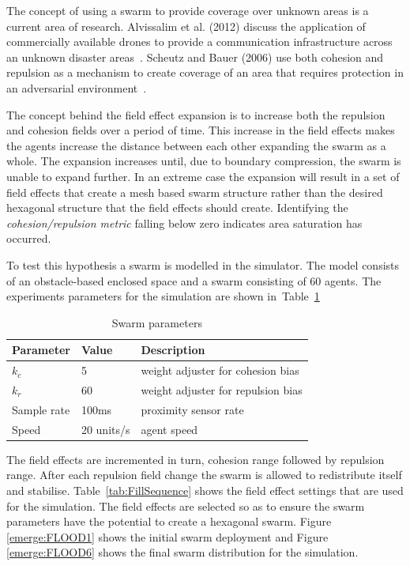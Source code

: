 \documentclass{ieeeaccess}
\begin{document}
The concept of using a swarm to provide coverage over unknown areas is a current area of research. Alvissalim et al. (2012) discuss the application of commercially available drones to provide a communication infrastructure across an unknown disaster areas~\cite{AZHMJJM:12}. Scheutz and Bauer (2006) use both cohesion and repulsion as a mechanism to create coverage of an area that requires protection in an adversarial environment~\cite{SB:06}.

The concept behind the field effect expansion is to increase both the repulsion and cohesion fields over a period of time. This increase in the field effects makes the agents increase the distance between each other expanding the swarm as a whole. The expansion increases until, due to boundary compression, the swarm is unable to expand further. In an extreme case the expansion will result in a set of field effects that create a mesh based swarm structure rather than the desired hexagonal structure that the field effects should create. Identifying the \textit{cohesion/repulsion metric} falling below zero indicates area saturation has occurred.

To test this hypothesis a swarm is modelled in the simulator. The model consists of an obstacle-based enclosed space and a swarm consisting of 60 agents. The experiments parameters for the simulation are shown in~Table~\ref{tab:FillParameters1}

\begin{table}[H]
\begin{center}
\begin{tabular}{| p{1.8cm} | p{1.5cm} | p{4.0cm} |}
\hline
\bf Parameter & \bf Value  & \bf Description \\ \hline
$k_c$         & 5          & weight adjuster for cohesion bias\\ \hline
$k_r$         & 60         & weight adjuster for repulsion bias\\ \hline
Sample rate   & 100ms      & proximity sensor rate\\ \hline
Speed         & 20 units/s & agent speed\\ \hline
\end{tabular}\caption{Swarm parameters} \label{tab:FillParameters1}
\end{center}
\end{table}

The field effects are incremented in turn, cohesion range followed by repulsion range. After each repulsion field change the swarm is allowed to redistribute itself and stabilise. Table~\ref{tab:FillSequence} shows the field effect settings that are used for the simulation. The field effects are selected so as to ensure the swarm parameters have the potential to create a hexagonal swarm. Figure \ref{emerge:FLOOD1} shows the initial swarm deployment and Figure \ref{emerge:FLOOD6} shows the final swarm distribution for the simulation. 
\end{document}
